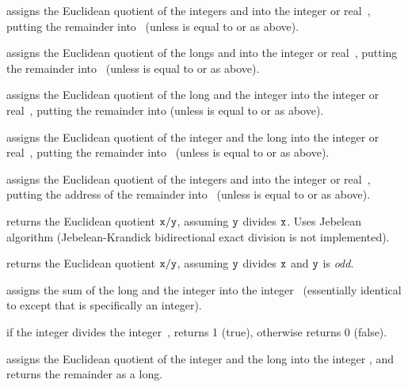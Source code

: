  assigns the Euclidean
quotient of the integers  and  into the integer or real~,
putting the remainder into~ (unless  is equal to  or
 as above).

 assigns the Euclidean
quotient of the longs  and  into the integer or real~,
putting the remainder into~ (unless  is equal to  or
 as above).

 assigns the Euclidean
quotient of the long  and the integer  into the integer or
real~, putting the remainder into  (unless  is equal
to  or  as above).

 assigns the Euclidean
quotient of the integer  and the long  into the integer or
real~, putting the remainder into~ (unless  is equal
to  or  as above).

 assigns the Euclidean
quotient of the integers  and  into the integer or real~,
putting the address of the remainder into~ (unless  is equal
to  or  as above).

 returns the Euclidean quotient ${\tt x}
/ {\tt y}$, assuming ${\tt y}$ divides ${\tt x}$. Uses Jebelean algorithm
(Jebelean-Krandick bidirectional exact division is not implemented).

 returns the Euclidean quotient ${\tt x}
/ {\tt y}$, assuming ${\tt y}$ divides ${\tt x}$ and ${\tt y}$ is \emph{odd}.


 assigns the sum of the long 
and the integer  into the integer~ (essentially identical to
 except that  is specifically an integer).

 if the integer  divides the
integer~, returns 1 (true), otherwise returns 0 (false).

 assigns the Euclidean quotient of
the integer  and the long  into the integer , and returns
the remainder as a long.

